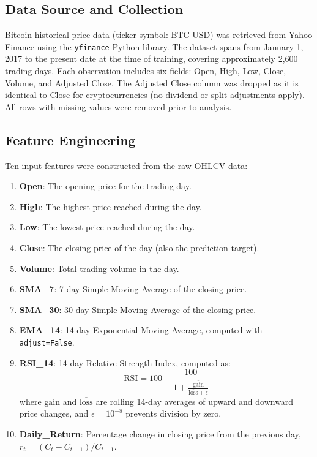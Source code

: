 \documentclass[12pt]{article}
\begin{document}
\subsection{Data Source and Collection}

Bitcoin historical price data (ticker symbol: BTC-USD) was retrieved from Yahoo Finance using the \texttt{yfinance} Python library. The dataset spans from January 1, 2017 to the present date at the time of training, covering approximately 2,600 trading days. Each observation includes six fields: Open, High, Low, Close, Volume, and Adjusted Close. The Adjusted Close column was dropped as it is identical to Close for cryptocurrencies (no dividend or split adjustments apply). All rows with missing values were removed prior to analysis.

\subsection{Feature Engineering}

Ten input features were constructed from the raw OHLCV data:

\begin{enumerate}[leftmargin=*]
    \item \textbf{Open}: The opening price for the trading day.
    \item \textbf{High}: The highest price reached during the day.
    \item \textbf{Low}: The lowest price reached during the day.
    \item \textbf{Close}: The closing price of the day (also the prediction target).
    \item \textbf{Volume}: Total trading volume in the day.
    \item \textbf{SMA\_7}: 7-day Simple Moving Average of the closing price.
    \item \textbf{SMA\_30}: 30-day Simple Moving Average of the closing price.
    \item \textbf{EMA\_14}: 14-day Exponential Moving Average, computed with \texttt{adjust=False}.
    \item \textbf{RSI\_14}: 14-day Relative Strength Index, computed as:
    \begin{equation}
        \text{RSI} = 100 - \frac{100}{1 + \frac{\overline{\text{gain}}}{\overline{\text{loss}} + \epsilon}}
    \end{equation}
    where $\overline{\text{gain}}$ and $\overline{\text{loss}}$ are rolling 14-day averages of upward and downward price changes, and $\epsilon = 10^{-8}$ prevents division by zero.
    \item \textbf{Daily\_Return}: Percentage change in closing price from the previous day, $r_t = (C_t - C_{t-1}) / C_{t-1}$.
\end{enumerate}
\end{document}
